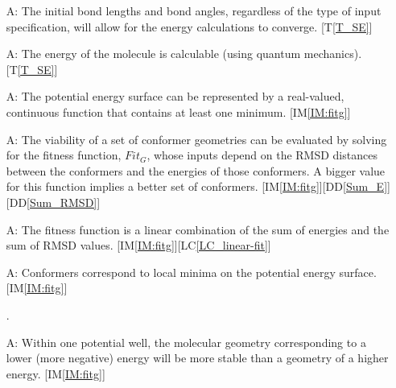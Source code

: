 \documentclass[12pt]{article}
\newcommand{\ddref}[1]{DD\ref{#1}}
\newcommand{\tref}[1]{T\ref{#1}}
\newcounter{assumpnum} %
\newcommand{\iref}[1]{IM\ref{#1}}
\newcommand{\lcref}[1]{LC\ref{#1}}
\begin{document}
\begin{itemize}



\item[A\refstepcounter{assumpnum}\theassumpnum \label{A:init-params-conv}:] The 
initial bond lengths and bond angles, regardless of the type of input 
specification, will allow for the energy calculations to converge. [\tref{T_SE}]

\item[A\refstepcounter{assumpnum}\theassumpnum \label{A:E-calculable}:] The 
energy of the molecule is calculable (using quantum mechanics). [\tref{T_SE}]

\item[A\refstepcounter{assumpnum}\theassumpnum \label{A:one-min}:] The 
potential energy surface can be represented by a real-valued, continuous 
function that contains at least one minimum. [\iref{IM:fitg}]

\item[A\refstepcounter{assumpnum}\theassumpnum \label{A:emp-func}:] The 
viability of a set of conformer geometries can be evaluated by solving for the 
fitness function, $Fit_G$, whose inputs depend on the RMSD distances between 
the conformers and the energies of those conformers. A bigger value for this 
function implies a better set of conformers. 
[\iref{IM:fitg}][\ddref{Sum_E}][\ddref{Sum_RMSD}]

\item[A\refstepcounter{assumpnum}\theassumpnum \label{A:linear-fit}:] The 
fitness function is a linear combination of the sum of energies and the sum of 
RMSD values. [\iref{IM:fitg}][\lcref{LC_linear-fit}]

\item[A\refstepcounter{assumpnum}\theassumpnum \label{A:conf=min}:] Conformers 
correspond to local minima on the potential energy surface. [\iref{IM:fitg}]

.

\item[A\refstepcounter{assumpnum}\theassumpnum \label{A:stability}:] Within one 
potential well, the molecular geometry corresponding to a lower (more negative) 
energy will be more stable than a geometry of a higher energy. [\iref{IM:fitg}]


\end{itemize}
\end{document}
